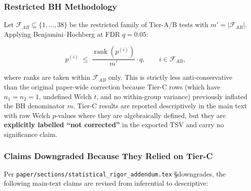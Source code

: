 \documentclass[
  american,
  11pt,
  a4paper,
  oneside]{report}
\begin{document}
\subsubsection{Restricted BH
Methodology}\label{restricted-bh-methodology}

Let \(\mathcal{F}_{AB} \subseteq \{1, \ldots, 38\}\) be the restricted
family of Tier-A/B tests with \(m' = |\mathcal{F}_{AB}|\). Applying
Benjamini--Hochberg at FDR \(q = 0.05\):

\[
p^{(i)} \;\le\; \frac{\operatorname{rank}(p^{(i)})}{m'} \cdot q, \qquad i \in \mathcal{F}_{AB},
\]

where ranks are taken within \(\mathcal{F}_{AB}\) only. This is strictly
less anti-conservative than the original paper-wide correction because
Tier-C rows (which have \(n_1{=}n_2{=}1\), undefined Welch \(t\), and no
within-group variance) previously inflated the BH denominator \(m\).
Tier-C results are reported descriptively in the main text with raw
Welch \(p\)-values where they are algebraically defined, but they are
\textbf{explicitly labelled ``not corrected''} in the exported TSV and
carry no significance claim.

\subsubsection{Claims Downgraded Because They Relied on
Tier-C}\label{claims-downgraded-because-they-relied-on-tier-c}

Per \texttt{paper/sections/statistical\_rigor\_addendum.tex}
§downgrades, the following main-text claims are revised from inferential
to descriptive:
\end{document}
